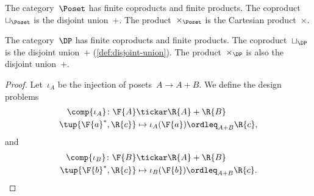 \begin{example}
    The category~$\Poset$ has finite coproducts and finite products.
    The coproduct~$\sqcup_\Poset$ is the disjoint union~$+$.
    The product~$\times_\Poset$ is the Cartesian product~$\times$.
\end{example}

\begin{lemma}
    The category~$\DP$ has finite coproducts and finite products.
    The coproduct~$\sqcup_\DP$ is the disjoint union~$+$ (\cref{def:disjoint-union}).
    The product~$\times_\DP$ is also the disjoint union~$+$.
\end{lemma}

\begin{proof}
Let~$\iota_A$ be the injection of posets~$A \to A+B$. We define the design problems
\begin{equation}
    \begin{aligned}
    \comp{\iota_A} \colon \F{A} &\tickar \R{A} + \R{B}\\
    \tup{\F{a}^*,\R{c}} &\mapsto \iota_A(\F{a})\ordleq_{A+B}\R{c},
    \end{aligned}
\end{equation}
and 
\begin{equation}
    \begin{aligned}
    \comp{\iota_B} \colon \F{B} &\tickar \R{A} + \R{B}\\
    \tup{\F{b}^*,\R{c}} &\mapsto \iota_B(\F{b})\ordleq_{A+B}\R{c}.
    \end{aligned}
\end{equation}


\end{proof}
